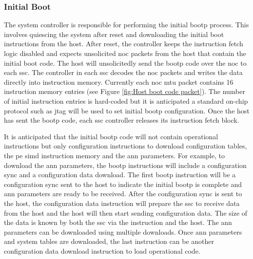 \subsubsection{Initial Boot}
\label{sec:Initial Boot}

The system controller is responsible for performing the initial \ac{bootp} process.
This involves quiescing the system after reset and downloading the initial boot instructions from the host.
After reset, the controller keeps the instruction fetch logic disabled and expects unsolicited \ac{noc} packets from the host that contain the initial boot code.
The host will unsolicitedly send the \ac{bootp} code over the \ac{noc} to each \ac{ssc}.
The controller in each \ac{ssc} decodes the \ac{noc} packets and writes the data directly into instruction memory.
Currently each \ac{noc} \ac{mtu} packet contains 16 instruction memory entries (see Figure \ref{fig:Host boot code packet}).
The number of initial instruction entries is hard-coded but it is anticipated a standard on-chip protocol such as \ac{jtag} will be used to set initial \ac{bootp} configuration.
Once the host has sent the \ac{bootp} code, each \ac{ssc} controller releases its instruction fetch block.

It is anticipated that the initial \ac{bootp} code will not contain operational instructions but only configuration instructions to download configuration tables, the \ac{pe} \ac{simd} instruction memory and the \ac{ann} parameters.
For example, to download the \ac{ann} parameters, the \ac{bootp} instructions will include a configuration sync and a configuration data download.
The first \ac{bootp} instruction will be a configuration sync sent to the host to indicate the initial \ac{bootp} is complete and \ac{ann} parameters are ready to be received.
After the configuration sync is sent to the host, the configuration data instruction will prepare the \ac{ssc} to receive data from the host and the host will then start sending configuration data. 
The size of the data is known by both the \ac{ssc} via the instruction and the host.
The \ac{ann} parameters can be downloaded using multiple downloads.
Once \ac{ann} parameters and system tables are downloaded, the last instruction can be another configuration data download instruction to load operational code.

